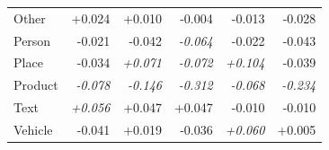 \begin{table}[ht]
\begin{tabular}{lrrr rr}
Other & +0.024 & +0.010 & -0.004 & -0.013 & -0.028 \\
Person & -0.021 & -0.042 & \textit{-0.064} & -0.022 & -0.043 \\
Place & -0.034 & \textit{+0.071} & \textit{-0.072} & \textit{+0.104} & -0.039 \\
Product & \textit{-0.078} & \textit{-0.146} & \textit{-0.312} & \textit{-0.068} & \textit{-0.234} \\
Text & \textit{+0.056} & +0.047 & +0.047 & -0.010 & -0.010 \\
Vehicle & -0.041 & +0.019 & -0.036 & \textit{+0.060} & +0.005 \\
\bottomrule
\end{tabular}
\end{table}
